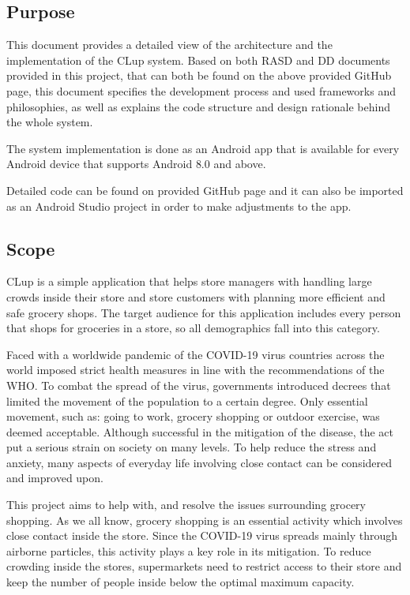 \subsection{Purpose}
\hspace{\parindent}This document provides a detailed view of the architecture and the implementation of the CLup system. Based on both RASD and DD documents provided in this project, that can both be found on the above provided GitHub page, this document specifies the development process and used frameworks and philosophies, as well as explains the code structure and design rationale behind the whole system.

The system implementation is done as an Android app that is available for every Android device that supports Android 8.0 and above. 

Detailed code can be found on provided GitHub page and it can also be imported as an Android Studio project in order to make adjustments to the app.


\newpage

\subsection{Scope}
\hspace{\parindent}CLup is a simple application that helps store managers with handling large crowds inside their store and store customers with planning more efficient and safe grocery shops. The target audience for this application includes every person that shops for groceries in a store, so all demographics fall into this category. 

Faced with a worldwide pandemic of the COVID-19 virus countries across the world imposed strict health measures in line with the recommendations of the WHO. To combat the spread of the virus, governments introduced decrees that limited the movement of the population to a certain degree. Only essential movement, such as: going to work, grocery shopping or outdoor exercise, was deemed acceptable. Although successful in the mitigation of the disease, the act put a serious strain on society on many levels. To help reduce the stress and anxiety, many aspects of everyday life involving close contact can be considered and improved upon. 

This project aims to help with, and resolve the issues surrounding grocery shopping. As we all know, grocery shopping is an essential activity which involves close contact inside the store. Since the COVID-19 virus spreads mainly through airborne particles, this activity plays a key role in its mitigation. To reduce crowding inside the stores, supermarkets need to restrict access to their store and keep the number of people inside below the optimal maximum capacity. 

